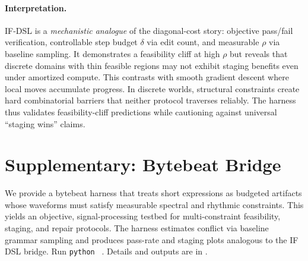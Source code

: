 \documentclass{article}
\theoremstyle{plain}
\theoremstyle{definition}
\theoremstyle{remark}
\begin{document}
\begin{table}[ht]
\centering
\small
\caption{IF-DSL pass rates by conflict level and evaluation contract ($N{=}10$ seeds). Contract A: equal total compute. Contract B: amortized (staged uses $k{\times}B$). High-$\rho$ sets show feasibility collapse, and staging shows no advantage under either contract.}
\label{tab:if_dsl}
\end{table}

\paragraph{Interpretation.}
IF-DSL is a \emph{mechanistic analogue} of the diagonal-cost story: objective pass/fail verification, controllable step budget $\delta$ via edit count, and measurable $\rho$ via baseline sampling. It demonstrates a feasibility cliff at high $\rho$ but reveals that discrete domains with thin feasible regions may not exhibit staging benefits even under amortized compute. This contrasts with smooth gradient descent where local moves accumulate progress. In discrete worlds, structural constraints create hard combinatorial barriers that neither protocol traverses reliably. The harness thus validates feasibility-cliff predictions while cautioning against universal ``staging wins'' claims.

\section{Supplementary: Bytebeat Bridge}\label{app:bytebeat_bridge}

We provide a bytebeat harness that treats short expressions as budgeted artifacts whose waveforms must satisfy measurable spectral and rhythmic constraints. This yields an objective, signal-processing testbed for multi-constraint feasibility, staging, and repair protocols. The harness estimates conflict via baseline grammar sampling and produces pass-rate and staging plots analogous to the IF DSL bridge. Run \texttt{python } . Details and outputs are in .
\end{document}
